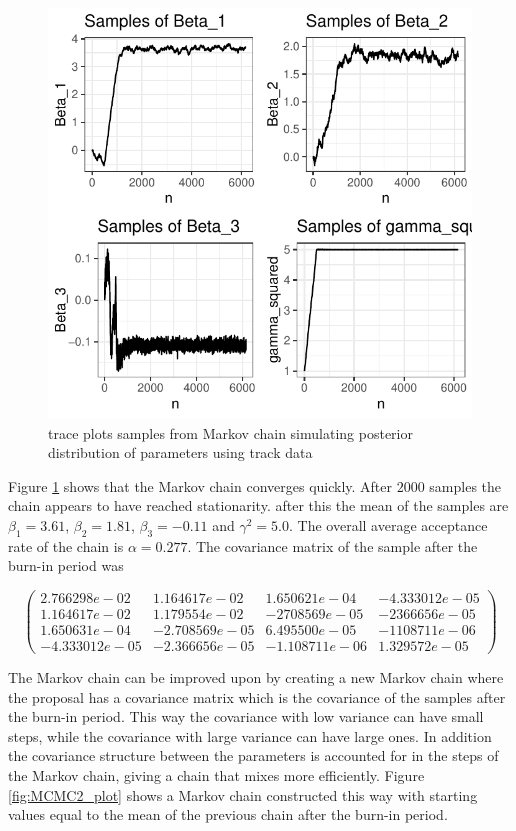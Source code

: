 \begin{figure}[H]
    \centering
    \includegraphics[width=\linewidth]{Images/ch3/MCMC_sample1_plot.pdf}
    \caption[MCMC1]{trace plots samples from Markov chain simulating posterior distribution of parameters using track data}
    \label{fig:MCMC1_plot}
\end{figure}

Figure \ref{fig:MCMC1_plot} shows that the Markov chain converges quickly. After $2000$ samples the chain appears to have reached stationarity. after this the mean of the samples are $\beta_1 = 3.61$, $\beta_2 = 1.81$, $\beta_3 = -0.11$ and $\gamma^2 = 5.0$. The overall average acceptance rate of the chain is $\alpha = 0.277$. The covariance matrix of the sample after the burn-in period was

$$
\begin{pmatrix}
    2.766298e-02 & 1.164617e-02 & 1.650621e-04 & -4.333012e-05 \\
    1.164617e-02 & 1.179554e-02 & -2708569e-05 & -2366656e-05 \\
    1.650631e-04 & -2.708569e-05 & 6.495500e-05 & -1108711e-06 \\
    -4.333012e-05 & -2.366656e-05 & -1.108711e-06 & 1.329572e-05 
\end{pmatrix}
$$


The Markov chain can be improved upon by creating a new Markov chain where the proposal has a covariance matrix which is the covariance of the samples after the burn-in period. This way the covariance with low variance can have small steps, while the covariance with large variance can have large ones. In addition the covariance structure between the parameters is accounted for in the steps of the Markov chain, giving a chain that mixes more efficiently. Figure \ref{fig:MCMC2_plot} shows a Markov chain constructed this way with starting values equal to the mean of the previous chain after the burn-in period.


